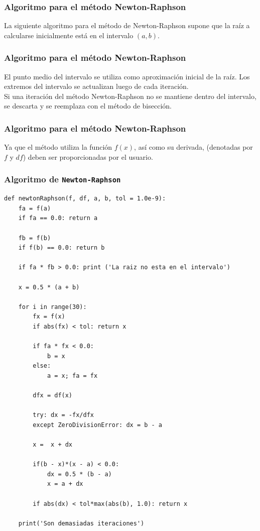 \begin{frame}
\frametitle{Algoritmo para el método Newton-Raphson}
La siguiente algoritmo para el método de Newton-Raphson supone que la raíz a calcularse inicialmente está en el intervalo $(a, b)$.
\end{frame}
\begin{frame}
\frametitle{Algoritmo para el método Newton-Raphson}
El punto medio del intervalo se utiliza como aproximación inicial de la raíz. Los extremos del intervalo se actualizan luego de cada iteración.
\\
\bigskip
Si una iteración del método Newton-Raphson no se mantiene dentro del intervalo, se descarta y se reemplaza con el método de bisección.
\end{frame}
\begin{frame}
\frametitle{Algoritmo para el método Newton-Raphson}
Ya que el método  utiliza la función $f(x)$, así como su derivada, (denotadas por $f$ y $df$) deben ser proporcionadas por el usuario.
\end{frame}
\begin{frame}
\frametitle{Algoritmo de \texttt{Newton-Raphson}}
\begin{lstlisting}[caption=Código del método N-R, style=FormattedNumber, basicstyle=\linespread{1.1}\ttfamily=\footnotesize, columns=fullflexible]
def newtonRaphson(f, df, a, b, tol = 1.0e-9):
    fa = f(a)
    if fa == 0.0: return a
    
    fb = f(b)
    if f(b) == 0.0: return b
    
    if fa * fb > 0.0: print ('La raiz no esta en el intervalo')
    
    x = 0.5 * (a + b)

    for i in range(30):
        fx = f(x)
        if abs(fx) < tol: return x

        if fa * fx < 0.0:
            b = x
        else:
            a = x; fa = fx

        dfx = df(x)
        
        try: dx = -fx/dfx
        except ZeroDivisionError: dx = b - a
        
        x =  x + dx
        
        if(b - x)*(x - a) < 0.0:
            dx = 0.5 * (b - a)
            x = a + dx
        
        if abs(dx) < tol*max(abs(b), 1.0): return x
    
    print('Son demasiadas iteraciones')
\end{lstlisting}
\end{frame}
